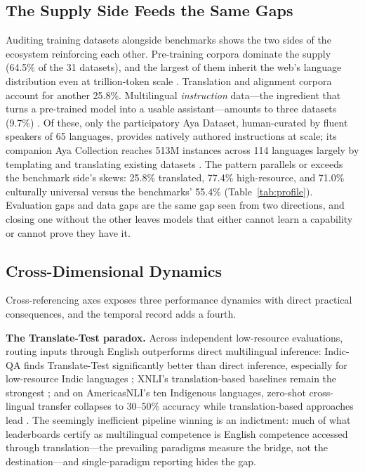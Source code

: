 \documentclass[letterpaper]{article} %
\begin{document}
\subsection{The Supply Side Feeds the Same Gaps}
Auditing training datasets alongside benchmarks shows the two sides of the ecosystem reinforcing each other. Pre-training corpora dominate the supply (64.5\% of the 31 datasets), and the largest of them inherit the web's language distribution even at trillion-token scale \cite{penedo2024finewebdatasetsdecantingweb,nguyen2023culturaxcleanedenormousmultilingual,kudugunta2023madlad400multilingualdocumentlevellarge,laurencon2023roots}. Translation and alignment corpora account for another 25.8\%. Multilingual \emph{instruction} data---the ingredient that turns a pre-trained model into a usable assistant---amounts to three datasets (9.7\%) \cite{muennighoff2023crosslingualgeneralizationmultitaskfinetuning,li2023bactrianxmultilingualreplicableinstructionfollowing}. Of these, only the participatory Aya Dataset, human-curated by fluent speakers of 65 languages, provides natively authored instructions at scale; its companion Aya Collection reaches 513M instances across 114 languages largely by templating and translating existing datasets \cite{singh2024aya}. The pattern parallels or exceeds the benchmark side's skews: 25.8\% translated, 77.4\% high-resource, and 71.0\% culturally universal versus the benchmarks' 55.4\% (Table~\ref{tab:profile}). Evaluation gaps and data gaps are the same gap seen from two directions, and closing one without the other leaves models that either cannot learn a capability or cannot prove they have it.
 
\subsection{Cross-Dimensional Dynamics}
Cross-referencing axes exposes three performance dynamics with direct practical consequences, and the temporal record adds a fourth.
 
\textbf{The Translate-Test paradox.} Across independent low-resource evaluations, routing inputs through English outperforms direct multilingual inference: Indic-QA finds Translate-Test significantly better than direct inference, especially for low-resource Indic languages \cite{singh2024indic}; XNLI's translation-based baselines remain the strongest \cite{conneau2018xnlievaluatingcrosslingualsentence}; and on AmericasNLI's ten Indigenous languages, zero-shot cross-lingual transfer collapses to 30--50\% accuracy while translation-based approaches lead \cite{kann2022americasnli}. The seemingly inefficient pipeline winning is an indictment: much of what leaderboards certify as multilingual competence is English competence accessed through translation---the prevailing paradigms measure the bridge, not the destination---and single-paradigm reporting hides the gap.
 
\end{document}
